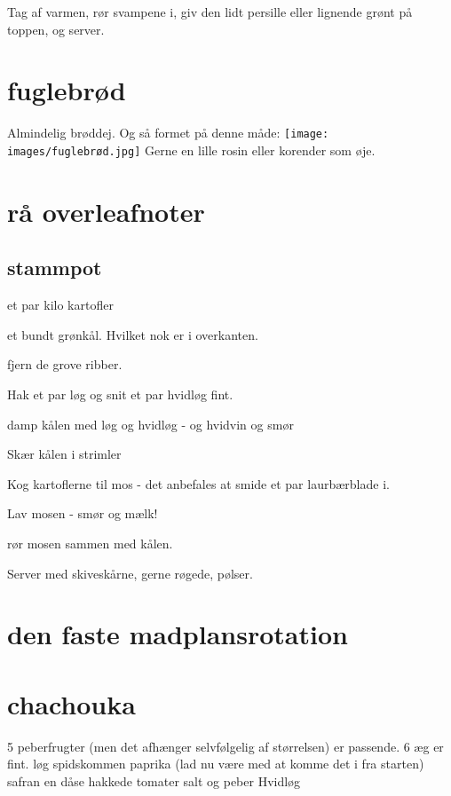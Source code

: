 \documentclass[
]{book}
\begin{document}
Tag af varmen, rør svampene i, giv den lidt persille eller lignende
grønt på toppen, og server.

\hypertarget{fuglebruxf8d}{%
\section{fuglebrød}\label{fuglebruxf8d}}

Almindelig brøddej. Og så formet på denne måde:
\texttt{[image: images/fuglebrød.jpg]}
Gerne en lille rosin eller korender som øje.

\hypertarget{ruxe5-overleafnoter}{%
\section{rå overleafnoter}\label{ruxe5-overleafnoter}}

\hypertarget{stammpot}{%
\subsection{stammpot}\label{stammpot}}

et par kilo kartofler

et bundt grønkål. Hvilket nok er i overkanten.

fjern de grove ribber.

Hak et par løg og snit et par hvidløg fint.

damp kålen med løg og hvidløg - og hvidvin og smør

Skær kålen i strimler

Kog kartoflerne til mos - det anbefales at smide et par laurbærblade i.

Lav mosen - smør og mælk!

rør mosen sammen med kålen.

Server med skiveskårne, gerne røgede, pølser.

\hypertarget{den-faste-madplansrotation}{%
\section{den faste madplansrotation}\label{den-faste-madplansrotation}}

\hypertarget{chachouka}{%
\section{chachouka}\label{chachouka}}

5 peberfrugter (men det afhænger selvfølgelig af størrelsen) er passende.
6 æg er fint.
løg
spidskommen
paprika (lad nu være med at komme det i fra starten)
safran
en dåse hakkede tomater
salt og peber
Hvidløg
\end{document}

